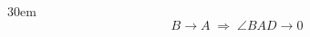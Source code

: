 \documentclass[border=4pt]{standalone}
\begin{document}
\begin{varwidth}{30em}
\large
\[ B \to A \;\Rightarrow\; \angle BAD \to 0 \]

\end{varwidth}
\end{document}
